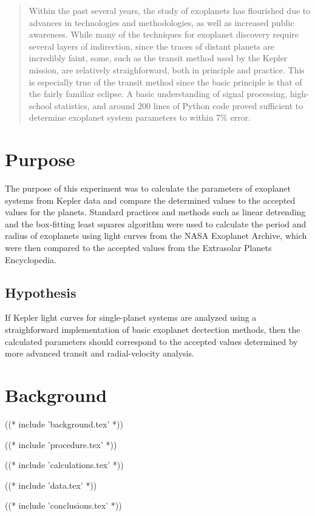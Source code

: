 \documentclass{report}
\begin{document}
\maketitle

\begin{abstract}
    Within the past several years, the study of exoplanets has flourished due to advances in technologies and methodologies, as well as increased public awareness.
    While many of the techniques for exoplanet discovery require several layers of indirection, since the traces of distant planets are incredibly faint, some, such as
    the transit method used by the Kepler mission, are relatively straighforward, both in principle and practice. This is especially true of the transit method since the
    basic principle is that of the fairly familiar eclipse. A basic understanding of signal processing, high-school statistics, and around 200 lines of Python code
    proved sufficient to determine exoplanet system parameters to within 7\% error.
\end{abstract}

\section{Purpose}

The purpose of this experiment was to calculate the parameters of exoplanet systems from Kepler data and compare the determined values to the accepted
values for the planets. Standard practices and methods such as linear detrending and the box-fitting least squares algorithm were used to calculate the
period and radius of exoplanets using light curves from the NASA Exoplanet Archive, which were then compared to the accepted values from the Extrasolar
Planets Encyclopedia.\autocite{exoplanetEncyclopedia, exoplanetArchive}

\subsection{Hypothesis}
If Kepler light curves for single-planet systems are analyzed using a straighforward implementation of basic exoplanet dectection methods, then
the calculated parameters should correspond to the accepted values determined by more advanced transit and radial-velocity analysis.

\section{Background}
% 
((* include 'background.tex' *))

% 
((* include 'procedure.tex' *))

((* include 'calculations.tex' *))

((* include 'data.tex' *))

((* include 'conclusions.tex' *))


\nocite{*}
\printbibliography
\end{document}
